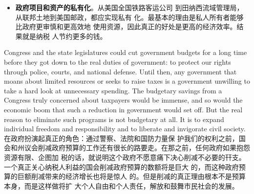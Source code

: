 \begin{paracol}{2}
\begin{itemize}
\end{itemize}
\switchcolumn
\begin{itemize}
	\item \textbf{政府项目和资产的私有化}。从美国全国铁路客运公司
	到田纳西流域管理局，从联邦土地到美国邮政，都应实现私有
	化。最基本的理由是私人所有者能够比政府更审慎和更高效地
	使用资源，因此真正的好处是更高的经济效率。结果就是纳税
	人节约更多的钱。 
\end{itemize}
\switchcolumn*
Congress and the state legislatures could cut government
budgets for a long time before they got down to the real duties
of government: to protect our rights through police, courts,
and national defense. Until then, any government that moans
about limited resources or seeks to raise taxes is a government
unwilling to take a hard look at unnecessary spending. The
budgetary savings from a Congress truly concerned about taxpayers would be immense, and so would the economic boom
that such a reduction in government would set off. But the real
reason to eliminate such programs is not budgetary at all. It is
to expand individual freedom and responsibility and to liberate
and invigorate civil society.
\switchcolumn
在政府扮演起真正的角色：通过警察、法院和国防力量保
护我们的权利之前，国会和州议会削减政府预算的工作还有很长的路要走。在那之前，任何政府如果抱怨资源有限、企图加
税的话，就说明这个政府不愿意痛下决心削减不必要的幵支。
一个真正关心纳税人利益的国会削减政府预算的数额将是巨大
的，而这种政府预算的巨额削减带来的经济增长也将是惊人
的。但是削减的真正理由根本不是预算本身，而是这样做将扩
大个人自由和个人责任，解放和鼓舞市民社会的发展。


\end{paracol}

